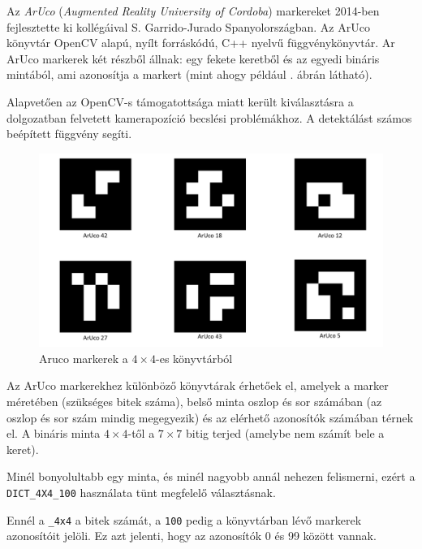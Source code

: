 
Az \textit{ArUco} (\textit{Augmented Reality University of Cordoba}) markereket 2014-ben fejlesztette ki kollégáival S. Garrido-Jurado Spanyolországban.
Az ArUco könyvtár OpenCV alapú, nyílt forráskódú, C++ nyelvű függvénykönyvtár.
Ar ArUco markerek két részből állnak: egy fekete keretből és az egyedi bináris mintából, ami azonosítja a markert (mint ahogy például . ábrán látható).

Alapvetően az OpenCV-s támogatottsága miatt került kiválasztásra a dolgozatban felvetett kamerapozíció becslési problémákhoz. A detektálást számos beépített függvény segíti.

\begin{figure}[htp]
    \centering
   	\includegraphics[scale=0.4]{images/kep.png}
	\caption{Aruco markerek a $4 \times 4$-es könyvtárból}
	\label{fig:kep}
\end{figure}


Az ArUco markerekhez különböző könyvtárak érhetőek el, amelyek a marker méretében (szükséges bitek száma), belső minta oszlop és sor számában (az oszlop és sor szám mindig megegyezik) és az elérhető azonosítók számában térnek el.
A bináris minta $4 \times 4$-től a $7 \times 7$ bitig terjed (amelybe nem számít bele a keret).

Minél bonyolultabb egy minta, és minél nagyobb annál nehezen felismerni, ezért a \texttt{DICT\_4X4\_100} használata tünt megfelelő választásnak.

Ennél a \texttt{\_4x4} a bitek számát, a \texttt{100} pedig a könyvtárban lévő markerek azonosítóit jelöli.
Ez azt jelenti, hogy az azonosítók 0 és 99 között vannak.


